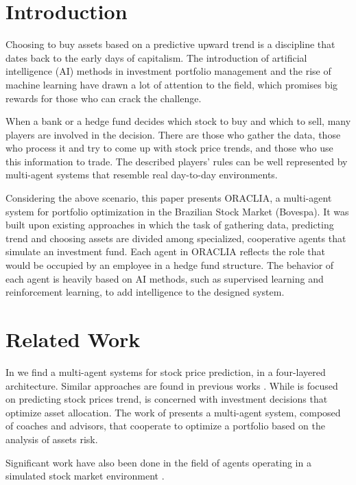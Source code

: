 \documentclass{aamas2017-extabs}
\begin{document}
\section{Introduction}
\label{sec-intro}
Choosing to buy assets based on a predictive upward trend is a discipline that dates back to the early days of capitalism. The introduction of artificial intelligence (AI) methods in investment portfolio management and the rise of machine learning have drawn a lot of attention to the field, which promises big rewards for those who can crack the challenge. 

When a bank or a hedge fund decides which stock to buy and which to sell, many players are involved in the decision. There are those who gather the data, those who process it and try to come up with stock price trends, and those who use this information to trade. The described players' rules can be well represented by multi-agent systems that resemble real day-to-day environments.

Considering the above scenario, this paper presents ORACLIA, a multi-agent system for portfolio optimization in the Brazilian Stock Market (Bovespa). It was built upon existing approaches in which the task of gathering data, predicting trend and choosing assets are divided among specialized, cooperative agents that simulate an investment fund. Each agent in ORACLIA reflects the role that would be occupied by an employee in a hedge fund structure. The behavior of each agent is heavily based on AI methods, such as supervised learning and reinforcement learning, to add intelligence to the designed system.

\section{Related Work}
\label{sec-review}

In \cite{hafezi2015bat} we find a multi-agent systems for stock price prediction, in a four-layered architecture. Similar approaches are found in previous works \cite{lee2007multiagent,luo2002multi, rahimi2009multi}. While \cite{lee2007multiagent} is focused on predicting stock prices trend, \cite{luo2002multi} is concerned with investment decisions that optimize asset allocation. The work of  \cite{de2013automated} presents a multi-agent system, composed of coaches and advisors, that cooperate to optimize a portfolio based on the analysis of assets risk.

Significant work have also been done in the field of agents operating in a simulated stock market environment \cite{Sherstov2005, PXS, Bloembergen2015}.
\end{document}
